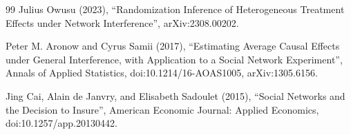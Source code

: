 \documentclass{article}
\begin{document}
\begin{thebibliography}{99}
   Julius Owusu (2023), ``Randomization Inference of Heterogeneous Treatment Effects under Network Interference'', arXiv:2308.00202.

   Peter M. Aronow and Cyrus Samii (2017), ``Estimating Average Causal Effects under General Interference, with Application to a Social Network Experiment'', Annals of Applied Statistics, doi:10.1214/16-AOAS1005, arXiv:1305.6156.

   Jing Cai, Alain de Janvry, and Elisabeth Sadoulet (2015), ``Social Networks and the Decision to Insure'', American Economic Journal: Applied Economics, doi:10.1257/app.20130442.

\end{thebibliography}
\end{document}
